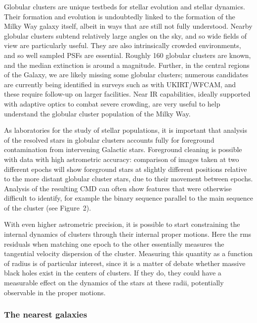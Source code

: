 Globular clusters are unique testbeds for stellar evolution and stellar
dynamics. Their formation and evolution is undoubtedly linked to the
formation of the Milky Way galaxy itself, albeit in ways that are still
not fully understood. Nearby globular clusters subtend relatively large
angles on the sky, and so wide fields of view are particularly
useful. They are also intrinsically crowded environments, and so well
sampled PSFs are essential. Roughly 160 globular clusters are known, and
the median extinction is around a magnitude. Further, in the central
regions of the Galaxy, we are likely missing some globular clusters;
numerous candidates are currently being identified in surveys such as
with UKIRT/WFCAM, and these require follow-up on larger facilities. Near
IR capabilities, ideally supported with adaptive optics to combat severe
crowding, are very useful to help understand the globular cluster
population of the Milky Way.  

As laboratories for the study of stellar populations, it is important
that analysis of the resolved stars in globular clusters accounts fully
for foreground contamination from intervening Galactic stars. Foreground
cleaning is possible with data with high astrometric accuracy:
comparison of images taken at two different epochs will show foreground
stars at slightly different positions relative to the more distant
globular cluster stars, due to their movement between epochs. Analysis
of the resulting CMD can often show features that were otherwise
difficult to identify, for example the binary sequence parallel to the
main sequence of the cluster (see Figure~2). 

With even higher astrometric precision, it is possible to start
constraining the internal dynamics of clusters through their internal
proper motions. Here the rms residuals when matching one epoch to the
other essentially measures the tangential velocity dispersion of the
cluster. Measuring this quantity as a function of radius is of
particular interest, since it is a matter of debate whether massive
black holes exist in the centers of clusters. If they do, they could
have a measurable effect on the dynamics of the stars at these radii,
potentially observable in the proper motions. 

\subsubsection{The nearest galaxies}


